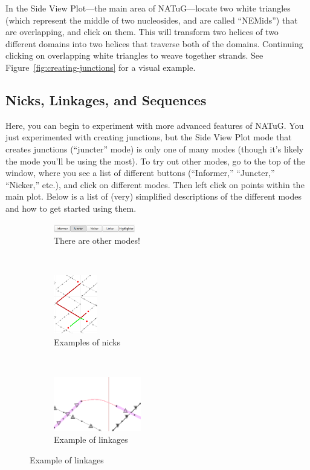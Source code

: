 \documentclass[titlepage]{article}
\begin{document}
In the Side View Plot---the main area of NATuG---locate two white triangles (which represent the middle of two nucleosides, and are called ``NEMids'') that are overlapping, and click on them. This will transform two helices of two different domains into two helices that traverse both of the domains. Continuing clicking on overlapping white triangles to weave together strands. See Figure~\ref{fig:creating-junctions} for a visual example.

\subsection{Nicks, Linkages, and Sequences}
Here, you can begin to experiment with more advanced features of NATuG. You just experimented with creating junctions, but the Side View Plot mode that creates junctions (``juncter'' mode) is only one of many modes (though it's likely the mode you'll be using the most). To try out other modes, go to the top of the window, where you see a list of different buttons (``Informer,'' ``Juncter,'' ``Nicker,'' etc.), and click on different modes. Then left click on points within the main plot. Below is a list of (very) simplified descriptions of the different modes and how to get started using them.

\begin{figure}[h] \label{fig:advanced-NATuG-features}
	\caption{Advanced NATuG features}
	\centering
	\begin{subfigure}{.3\textwidth}
		\centering
		\includegraphics[width=1.4in]{juncter-activated.png}
		\caption{There are other modes!}
	\end{subfigure}%
	~
	\begin{subfigure}{.3\textwidth}
		\centering
		\includegraphics[height=1in]{nick-examples.png}
		\caption{Examples of nicks}
	\end{subfigure}%
	~
	\begin{subfigure}{.3\textwidth}
		\centering
		\includegraphics[width=1.5in]{linkage-example.png}
		\caption{Example of linkages}
	\end{subfigure}
\end{figure}
\end{document}
